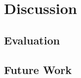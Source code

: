 \chapter{Discussion}
\label{cha:discussion}

\section{Evaluation}
\label{sec:evaluation}

\section{Future Work}
\label{sec:future-work}




